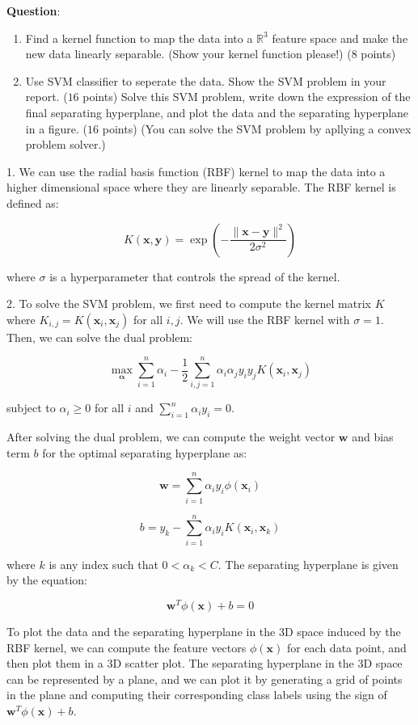 \documentclass[10pt]{article}
\renewcommand{\mathbf}{\boldsymbol}
\begin{document}
\textbf{Question}: 
\begin{enumerate}
	\item Find a kernel function to map the data into a $\mathbb{R}^3$ feature space and make the new data linearly separable. (Show your kernel function please!) ($8$ points)
	\item Use SVM classifier to seperate the data. Show the SVM problem in your report. ($16$ points) Solve this SVM problem, write down the expression of the final separating hyperplane, and plot the data and the separating hyperplane in a figure. ($16$ points) (You can solve the SVM problem by apllying a convex problem solver.)
\end{enumerate}

\newpage

1. We can use the radial basis function (RBF) kernel to map the data into a higher dimensional space where they are linearly separable. The RBF kernel is defined as:

$$K(\mathbf{x}, \mathbf{y}) = \exp\left(-\frac{\|\mathbf{x}-\mathbf{y}\|^2}{2\sigma^2}\right)$$

where $\sigma$ is a hyperparameter that controls the spread of the kernel.

2. To solve the SVM problem, we first need to compute the kernel matrix $K$ where $K_{i,j} = K(\mathbf{x}_i, \mathbf{x}_j)$ for all $i,j$. We will use the RBF kernel with $\sigma=1$. Then, we can solve the dual problem:

$$\max_{\mathbf{\alpha}} \sum_{i=1}^{n}\alpha_i - \frac{1}{2}\sum_{i,j=1}^{n}\alpha_i\alpha_j y_i y_j K(\mathbf{x}_i,\mathbf{x}_j)$$

subject to $\alpha_i \geq 0$ for all $i$ and $\sum_{i=1}^{n}\alpha_iy_i = 0$. 

After solving the dual problem, we can compute the weight vector $\mathbf{w}$ and bias term $b$ for the optimal separating hyperplane as:

$$\mathbf{w} = \sum_{i=1}^{n}\alpha_i y_i \phi(\mathbf{x}_i)$$

$$b = y_k - \sum_{i=1}^{n}\alpha_i y_i K(\mathbf{x}_i,\mathbf{x}_k)$$

where $k$ is any index such that $0 < \alpha_k < C$. The separating hyperplane is given by the equation:

$$\mathbf{w}^T \phi(\mathbf{x}) + b = 0$$

To plot the data and the separating hyperplane in the 3D space induced by the RBF kernel, we can compute the feature vectors $\phi(\mathbf{x})$ for each data point, and then plot them in a 3D scatter plot. The separating hyperplane in the 3D space can be represented by a plane, and we can plot it by generating a grid of points in the plane and computing their corresponding class labels using the sign of $\mathbf{w}^T \phi(\mathbf{x}) + b$.
\end{document}
